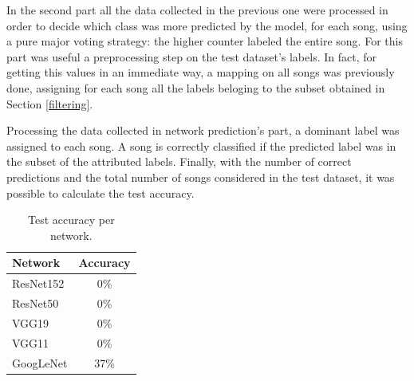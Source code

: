 \documentclass[10pt,twocolumn,letterpaper]{article}
\begin{document}
In the second part all the data collected in the previous one were processed in order to decide which class was more predicted by the model, for each song, using a pure major voting strategy: the higher counter labeled the entire song. For this part was useful a preprocessing step on the test dataset's labels. In fact, for getting this values in an immediate way, a mapping on all songs was previously done, assigning for each song all the labels beloging to the subset obtained in Section \ref{filtering}.

Processing the data collected in network prediction's part, a dominant label was assigned to each song. A song is correctly classified if the predicted label was in the subset of the attributed labels. Finally, with the number of correct predictions and the total number of songs considered in the test dataset, it was possible to calculate the test accuracy.



   \begin{table}[!h]
      \begin{center}
      \def\arraystretch{1.5}
      \begin{tabular}{l|c}
         \textbf{Network} & \textbf{Accuracy} \\
      \hline
      ResNet152 & 0\%  \\
      \hline
      ResNet50 & 0\%  \\
      \hline
      VGG19 & 0\% \\
      \hline
      VGG11 & 0\% \\
      \hline
      GoogLeNet & 37\% \\
      \end{tabular}
      \end{center}
      \caption{Test accuracy per network.}
      \label{tab:test}
      \end{table}
\end{document}
